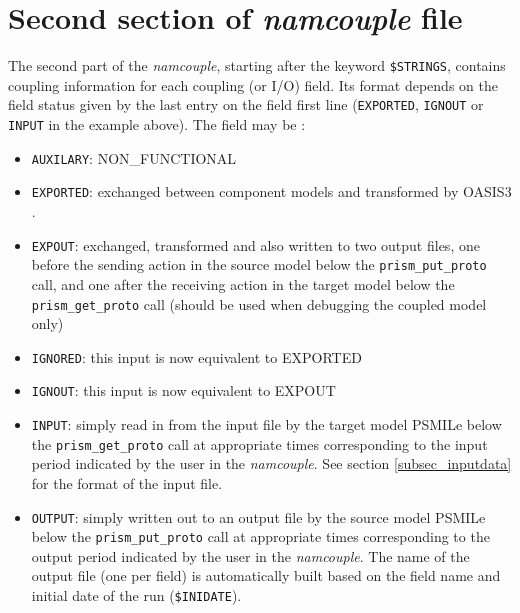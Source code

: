 
\section{Second section of {\it namcouple} file }
\label{subsec_namcouplesecond}

The second part of the {\it namcouple}, starting after the keyword
{\tt \$STRINGS}, contains coupling information for each coupling (or
I/O) field.  Its format depends on the field status given by the last
entry on the field first line ({\tt EXPORTED}, {\tt IGNOUT} or {\tt
INPUT} in the example above). The field may be :

\begin{itemize}
\item {\tt AUXILARY}: NON\_FUNCTIONAL
\item {\tt EXPORTED}: exchanged between component models and
  transformed by OASIS3 .
\item {\tt EXPOUT}: exchanged, transformed and also written to two
  output files, one before the sending action in the source model
  below the {\tt prism\_put\_proto} call, and one after the receiving
  action in the target model below the {\tt prism\_get\_proto} call (should
  be used when debugging the coupled model only)
\item {\tt IGNORED}: this input is now equivalent to EXPORTED
\item {\tt IGNOUT}: this input is now equivalent to EXPOUT
\item {\tt INPUT}: simply read in from the input file by the target
  model PSMILe below the {\tt prism\_get\_proto} call at appropriate
  times corresponding to the input period indicated by the user in the
  {\it namcouple}. See section
  \ref{subsec_inputdata} for the format of the input file.
\item {\tt OUTPUT}: simply written out to an output file by the source
  model PSMILe below the {\tt prism\_put\_proto} call at appropriate
  times corresponding to the output period indicated by the user in
  the {\it namcouple}. The name of the output file (one per field) is
  automatically built based on the field name and initial date of the
  run ({\tt \$INIDATE}).

\end{itemize}


